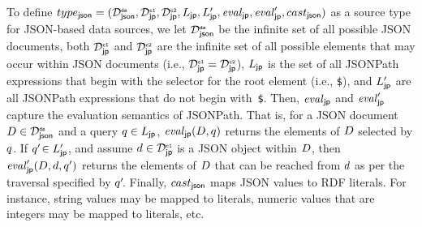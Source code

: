 \begin{example}
	\label{ex:source_type_json}
	To define $type_{\mathsf{json}} = (\mathcal{D}^\texttt{\tiny ds}_{\mathsf{json}}, \mathcal{D}^\texttt{\tiny c1}_{\mathsf{jp}}, \mathcal{D}^\texttt{\tiny c2}_{\mathsf{jp}}, L_{\mathsf{jp}}, L_{\mathsf{jp}}', \mathit{eval}_{\mathsf{jp}}, \mathit{eval}_{\mathsf{jp}}', cast_{\mathsf{json}})$ as a source type for JSON-based data sources, we let $\mathcal{D}^\texttt{\tiny ds}_{\mathsf{json}}$ be
	the infinite set of all possible JSON documents, both $\mathcal{D}^\texttt{\tiny c1}_{\mathsf{jp}}$ and $\mathcal{D}^\texttt{\tiny c2}_{\mathsf{jp}}$ are the infinite set of all possible elements that may occur within JSON documents (i.e., $\mathcal{D}^\texttt{\tiny c1}_{\mathsf{jp}} = \mathcal{D}^\texttt{\tiny c2}_{\mathsf{jp}}$),
	$L_{\mathsf{jp}}$ is the set of all JSONPath expressions that begin with the selector for the root element (i.e., \texttt{\$}), and
	$L_{\mathsf{jp}}'$ are all JSONPath expressions that do not begin with~\texttt{\$}.
	Then, $\mathit{eval}_{\mathsf{jp}}$ and $\mathit{eval}_{\mathsf{jp}}'$ capture the evaluation semantics of JSONPath.
	That is, for a JSON document $D \in \mathcal{D}^\texttt{\tiny ds}_{\mathsf{json}}$ and a query $q \in L_{\mathsf{jp}}$, $\mathit{eval}_{\mathsf{jp}}(D,q)$ returns the elements of $D$ selected by $q$. If $q'\! \in L_{\mathsf{jp}}'$, and assume $d \in \mathcal{D}^\texttt{\tiny c1}_{\mathsf{jp}}$ is a JSON object within $D$, then $\mathit{eval}_{\mathsf{jp}}'(D,d,q')$ returns the elements of $D$ that can be reached from $d$ as per the traversal specified by $q'\!$.
	Finally, $cast_{\mathsf{json}}$ maps JSON values to RDF literals. For instance, string values may be mapped to  literals, numeric values that are integers may be mapped to  literals, etc.
\end{example}

\vspace{-3mm} %

